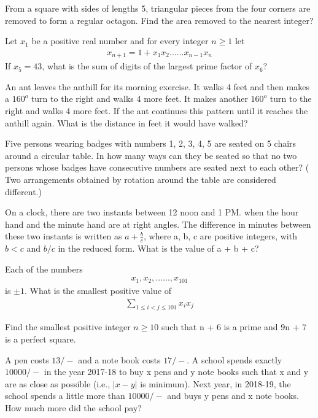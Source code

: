 \item From a square with sides of lengths 5, triangular pieces from the four corners are removed to form a regular octagon. Find the area removed to the nearest integer?

\item Let $x_1$ be a positive real number and for every integer $n \geq 1$ let 
\begin{align*}
x_{n + 1} = 1 + x_1x_2......x_{n - 1}x_n
\end{align*}
If $x_5 = 43$, what is the sum of digits of the largest prime factor of $x_6$?

\item An ant leaves the anthill for its morning exercise. It walks 4 feet and then makes a $160^{o}$ turn to the right and walks 4 more feet. It makes another $160^{o}$ turn to the right and walks 4 more feet. If the ant continues this pattern until it reaches the anthill again. What is the distance in feet it would have walked?

\item Five persons wearing badges with numbers 1, 2, 3, 4, 5 are seated on 5 chairs around a circular table. In how many ways can they be seated so that no two persons whose badges have consecutive numbers are seated next to each other?
( Two arrangements obtained by rotation around the table are considered different.)

\item On a clock, there are two instants between 12 noon and 1 PM. when the hour hand and the minute hand are at right angles. The difference in minutes between these two instants is written as $a + \frac{b}{c}$, where a, b, c are positive integers, with $b < c$ and $b/c$ in the reduced form. What is the value of a + b + c?

\item Each of the numbers 
\begin{align*}
x_1, x_2,......,x_{101}
\end{align*}
is $\pm 1$. What is the smallest positive value of 
\begin{align*}
\sum_{1 \leq i < j \leq 101}  x_ix_j
\end{align*}

\item Find the smallest positive integer $n \geq 10$ such that n + 6 is a prime and 9n + 7 is a perfect square.

\item A pen costs $13/-$ and a note book costs $17/-$. A school spends exactly $10000/-$ in the year 2017-18 to buy x pens and y note books such that x and y are as close as possible (i.e., $|x - y|$ is minimum). Next year, in 2018-19, the school spends a little more than $10000/-$ and buys y pens and x note books. How much more did the school pay?

